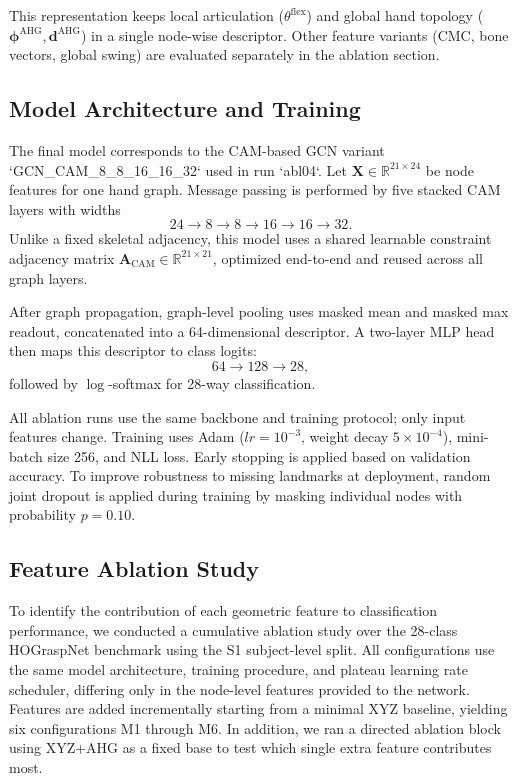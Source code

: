 \documentclass[letterpaper, 10 pt, conference]{ieeeconf}  %
\begin{document}
This representation keeps local articulation (\(\theta^{\text{flex}}\)) and global hand topology (\(\boldsymbol{\phi}^{\text{AHG}},\mathbf{d}^{\text{AHG}}\)) in a single node-wise descriptor. Other feature variants (CMC, bone vectors, global swing) are evaluated separately in the ablation section.

\subsection{Model Architecture and Training}

The final model corresponds to the CAM-based GCN variant `GCN\_CAM\_8\_8\_16\_16\_32` used in run `abl04`. Let \(\mathbf{X}\in\mathbb{R}^{21\times 24}\) be node features for one hand graph. Message passing is performed by five stacked CAM layers with widths
\[
24 \rightarrow 8 \rightarrow 8 \rightarrow 16 \rightarrow 16 \rightarrow 32.
\]
Unlike a fixed skeletal adjacency, this model uses a shared learnable constraint adjacency matrix
\(\mathbf{A}_{\text{CAM}}\in\mathbb{R}^{21\times 21}\), optimized end-to-end and reused across all graph layers.

After graph propagation, graph-level pooling uses masked mean and masked max readout, concatenated into a 64-dimensional descriptor. A two-layer MLP head then maps this descriptor to class logits:
\[
64 \rightarrow 128 \rightarrow 28,
\]
followed by \(\log\)-softmax for 28-way classification.

All ablation runs use the same backbone and training protocol; only input features change. Training uses Adam (\(lr=10^{-3}\), weight decay \(5\times10^{-4}\)), mini-batch size 256, and NLL loss. Early stopping is applied based on validation accuracy. To improve robustness to missing landmarks at deployment, random joint dropout is applied during training by masking individual nodes with probability \(p=0.10\).

\subsection{Feature Ablation Study}

To identify the contribution of each geometric feature to classification performance, we conducted a cumulative ablation study over the 28-class HOGraspNet benchmark using the S1
subject-level split. All configurations use the same model architecture, training procedure, and plateau learning rate scheduler, differing only in the node-level features provided to the network. Features are added incrementally starting from a minimal XYZ baseline, yielding six configurations M1 through M6. In addition, we ran a directed ablation block using XYZ+AHG as a fixed base to test which single extra feature contributes most.
\end{document}
